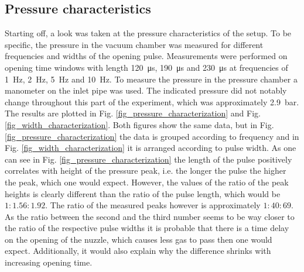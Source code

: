 \documentclass[a4paper,10pt]{article}
\begin{document}
\subsection{Pressure characteristics}
Starting off, a look was taken at the pressure characteristics of the setup. To be specific, the pressure in the vacuum chamber was measured for different frequencies and widths of the opening pulse. Measurements were performed on opening time windows with length \SI{120}{\micro \s}, \SI{190}{\micro \s} and \SI{230}{\micro \s} at frequencies of \SI{1}{\hertz}, \SI{2}{\hertz}, \SI{5}{\hertz} and \SI{10}{\hertz}. To measure the pressure in the pressure chamber a manometer on the inlet pipe was used. The indicated pressure did not notably change throughout this part of the experiment, which was approximately \SI{2.9}{\bar}. The results are plotted in Fig. \ref{fig_pressure_characterization} and Fig. \ref{fig_width_characterization}. Both figures show the same data, but in Fig. \ref{fig_pressure_characterization} the data is grouped according to frequency and in Fig. \ref{fig_width_characterization} it is arranged according to pulse width. As one can see in Fig. \ref{fig_pressure_characterization} the length of the pulse positively correlates with height of the pressure peak, i.e. the longer the pulse the higher the peak, which one would expect. However, the values of the ratio of the peak heights is clearly different than the ratio of the pulse length, which would be $1:1.56:1.92$. The ratio of the measured peaks however is approximately $1:40:69$. As the ratio between the second and the third number seems to be way closer to the ratio of the respective pulse widths it is probable that there is a time delay on the opening of the nuzzle, which causes less gas to pass then one would expect. Additionally, it would also explain why the difference shrinks with increasing opening time. 
\end{document}
